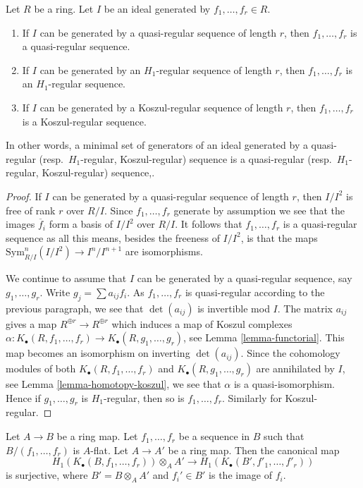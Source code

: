 \begin{lemma}
\label{lemma-independence-of-generators}
Let $R$ be a ring. Let $I$ be an ideal generated by $f_1, \ldots, f_r \in R$.
\begin{enumerate}
\item If $I$ can be generated by a quasi-regular sequence of length $r$,
then $f_1, \ldots, f_r$ is a quasi-regular sequence.
\item If $I$ can be generated by an $H_1$-regular sequence of length $r$,
then $f_1, \ldots, f_r$ is an $H_1$-regular sequence.
\item If $I$ can be generated by a Koszul-regular sequence of length $r$,
then $f_1, \ldots, f_r$ is a Koszul-regular sequence.
\end{enumerate}
In other words, a minimal set of generators of an ideal generated by
a quasi-regular (resp.\ $H_1$-regular, Koszul-regular) sequence is a
quasi-regular (resp.\ $H_1$-regular, Koszul-regular) sequence,.
\end{lemma}

\begin{proof}
If $I$ can be generated by a quasi-regular sequence of length $r$,
then $I/I^2$ is free of rank $r$ over $R/I$. Since $f_1, \ldots, f_r$
generate by assumption we see that the images $\overline{f}_i$ form a basis of
$I/I^2$ over $R/I$. It follows that $f_1, \ldots, f_r$ is a quasi-regular
sequence as all this means, besides the freeness of $I/I^2$, is that the maps
$\text{Sym}^n_{R/I}(I/I^2) \to I^n/I^{n + 1}$ are isomorphisms.

\medskip\noindent
We continue to assume that $I$ can be generated by a
quasi-regular sequence, say
$g_1, \ldots, g_r$. Write $g_j = \sum a_{ij}f_i$. As $f_1, \ldots, f_r$
is quasi-regular according to the previous paragraph, we see that
$\det(a_{ij})$ is invertible mod $I$. The matrix
$a_{ij}$ gives a map $R^{\oplus r} \to R^{\oplus r}$ which induces
a map of Koszul complexes
$\alpha : K_\bullet(R, f_1, \ldots, f_r) \to K_\bullet(R, g_1, \ldots, g_r)$,
see
Lemma \ref{lemma-functorial}.
This map becomes an isomorphism on inverting $\det(a_{ij})$.
Since the cohomology modules of both $K_\bullet(R, f_1, \ldots, f_r)$ and
$K_\bullet(R, g_1, \ldots, g_r)$ are annihilated by $I$, see
Lemma \ref{lemma-homotopy-koszul},
we see that $\alpha$ is a quasi-isomorphism. Hence if $g_1, \ldots, g_r$
is $H_1$-regular, then so is $f_1, \ldots, f_r$. Similarly
for Koszul-regular.
\end{proof}

\begin{lemma}
\label{lemma-base-change-H1-regular}
Let $A \to B$ be a ring map.
Let $f_1, \ldots, f_r$ be a sequence in $B$ such that $B/(f_1, \ldots, f_r)$
is $A$-flat. Let $A \to A'$ be a ring map. Then the canonical map
$$
H_1(K_\bullet(B, f_1, \ldots, f_r)) \otimes_A A'
\longrightarrow
H_1(K_\bullet(B', f'_1, \ldots, f'_r))
$$
is surjective, where $B' = B \otimes_A A'$ and $f_i' \in B'$ is the image
of $f_i$.
\end{lemma}

